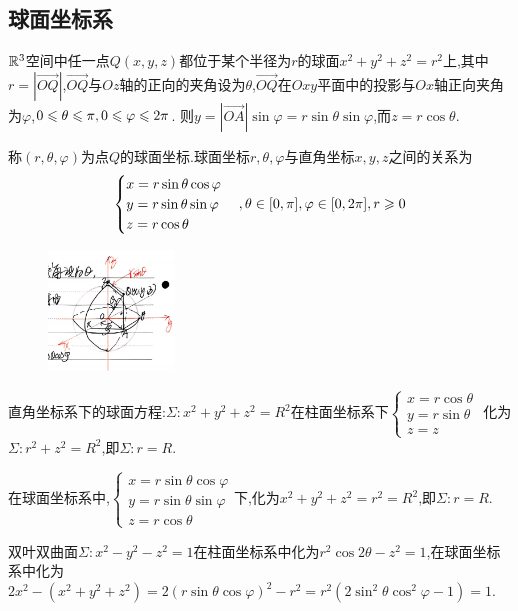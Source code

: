 \subsection{球面坐标系}

$\mathbb{R}^3$空间中任一点$Q(x,y,z)$都位于某个半径为$r$的球面$x^2+y^2+z^2=r^2$上,其中$r = | \overrightarrow{OQ} |$,$\overrightarrow{OQ}$与$Oz$轴的正向的夹角设为$\theta$,$\overrightarrow{OQ}$在$Oxy$平面中的投影与$Ox$轴正向夹角为$\varphi$,$0 \leqslant \theta \leqslant \pi, 0 \leqslant \varphi \leqslant 2 \pi$.
则$y = | \overrightarrow{OA}| \sin \varphi = r \sin \theta \sin \varphi$,而$z = r \cos \theta$.

称$(r,\theta,\varphi)$为点$Q$的球面坐标.球面坐标$r,\theta,\varphi$与直角坐标$x,y,z$之间的关系为
$$
\begin{cases}
    x = r \sin \theta \cos \varphi\\
    y = r \sin \theta \sin \varphi\\
    z = r \cos \theta
\end{cases},\theta \in [0,\pi],\varphi \in [0,2\pi], r \geqslant 0
$$

\begin{figure}[htbp]
    \centering
    \includegraphics[width=0.3\textwidth]{figure/5-3.png}
    \caption{}
\end{figure}

直角坐标系下的球面方程:$\Sigma:x^2+y^2+z^2 = R^2$在柱面坐标系下$\begin{cases}
    x = r \cos \theta\\
    y = r \sin \theta\\
    z = z
\end{cases}$ 化为$\Sigma:r^2+z^2 = R^2$,即$\Sigma:r = R$.

在球面坐标系中,$\begin{cases}
    x = r \sin \theta \cos \varphi\\
    y = r \sin \theta \sin \varphi\\
    z = r \cos \theta
\end{cases}$下,化为$x^2+y^2+z^2 = r^2 = R^2$,即$\Sigma:r = R$.

双叶双曲面$\Sigma:x^2-y^2-z^2 = 1$在柱面坐标系中化为$r^2 \cos 2 \theta - z^2 = 1$,在球面坐标系中化为$2x^2 - (x^2 + y^2 + z^2) = 2(r \sin \theta \cos \varphi)^2 - r^2 = r^2 ( 2 \sin^2 \theta \cos^2 \varphi -1) = 1$.

